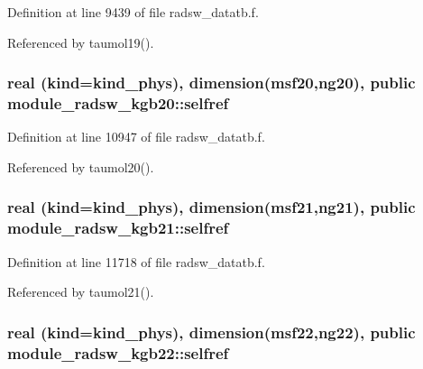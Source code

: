 Definition at line 9439 of file radsw\+\_\+datatb.\+f.



Referenced by taumol19().

\subsubsection[{\texorpdfstring{selfref}{selfref}}]{\setlength{\rightskip}{0pt plus 5cm}real (kind=kind\+\_\+phys), dimension(msf20,ng20), public module\+\_\+radsw\+\_\+kgb20\+::selfref}\hypertarget{group__module__radsw__main_gaa3853af5e29277f9ed2bdd397cab5029}{}\label{group__module__radsw__main_gaa3853af5e29277f9ed2bdd397cab5029}


Definition at line 10947 of file radsw\+\_\+datatb.\+f.



Referenced by taumol20().

\subsubsection[{\texorpdfstring{selfref}{selfref}}]{\setlength{\rightskip}{0pt plus 5cm}real (kind=kind\+\_\+phys), dimension(msf21,ng21), public module\+\_\+radsw\+\_\+kgb21\+::selfref}\hypertarget{group__module__radsw__main_ga76fc3e4566fcee982b99b10ea562ba93}{}\label{group__module__radsw__main_ga76fc3e4566fcee982b99b10ea562ba93}


Definition at line 11718 of file radsw\+\_\+datatb.\+f.



Referenced by taumol21().

\subsubsection[{\texorpdfstring{selfref}{selfref}}]{\setlength{\rightskip}{0pt plus 5cm}real (kind=kind\+\_\+phys), dimension(msf22,ng22), public module\+\_\+radsw\+\_\+kgb22\+::selfref}\hypertarget{group__module__radsw__main_gabc3bd99e8ad7d1f09fb7fab7ed67a32b}{}\label{group__module__radsw__main_gabc3bd99e8ad7d1f09fb7fab7ed67a32b}



